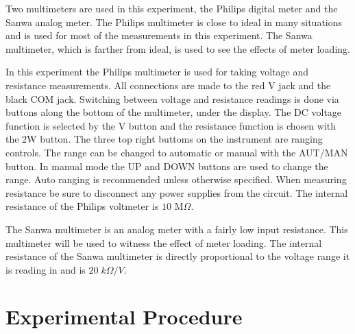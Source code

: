 \noindent Two multimeters are used in this experiment, the Philips digital meter and the Sanwa analog meter. The Philips multimeter is close to ideal in many situations and is used for most of the measurements in this experiment. The Sanwa multimeter, which is farther from ideal, is used to see the effects of meter loading.

\noindent In this experiment the Philips multimeter is used for taking voltage and resistance measurements. All connections are made to the red V jack and the black COM jack. Switching between voltage and resistance readings is done via buttons along the bottom of the multimeter, under the display. The DC voltage function is selected by the V button and the resistance function is chosen with the 2W button. The three top right buttoms on the instrument are ranging controls. The range can be changed to automatic or manual with the AUT/MAN button. In manual mode the UP and DOWN buttons are used to change the range. Auto ranging is recommended unless otherwise specified. When measuring resistance be sure to disconnect any power supplies from the circuit. The internal resistance of the Philips voltmeter is $10$ M$\Omega$.

\noindent The Sanwa multimeter is an analog meter with a fairly low input resistance. This multimeter will be used to witness the effect of meter loading. The internal resistance of the Sanwa multimeter is directly proportional to the voltage range it is reading in and is $20\;k\Omega/V$.


\section{Experimental Procedure}


